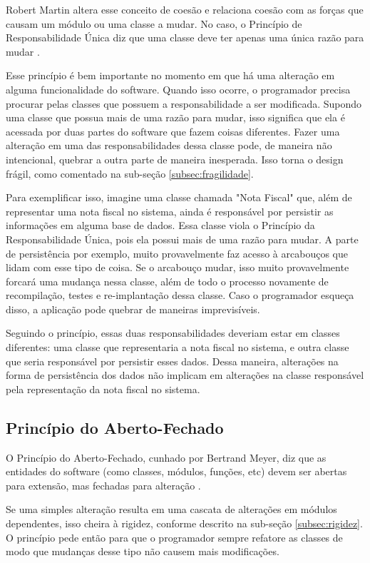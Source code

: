 Robert Martin altera esse conceito de coesão e relaciona coesão com as forças
que  causam um módulo ou uma classe a mudar. No caso, o Princípio de
Responsabilidade Única diz que uma classe deve ter apenas uma única razão para 
mudar \cite{bob-martin}.

Esse princípio é bem importante no momento em que há uma alteração em alguma 
funcionalidade do software. Quando isso ocorre, o programador precisa procurar 
pelas classes que possuem a responsabilidade a ser modificada. Supondo uma
classe  que possua mais de uma razão para mudar, isso significa que ela é
acessada  por duas partes do software que fazem coisas diferentes.  Fazer uma
alteração em uma das responsabilidades dessa classe pode, de maneira não
intencional, quebrar a outra parte de maneira inesperada. Isso torna o design
frágil, como comentado na sub-seção \ref{subsec:fragilidade}.

Para exemplificar isso, imagine uma classe chamada "Nota Fiscal" que, além de
representar uma nota fiscal no sistema, ainda é responsável por persistir as 
informações em alguma base de dados. Essa classe viola o Princípio da
Responsabilidade Única, pois ela possui mais de uma razão para mudar. A parte de
persistência por exemplo, muito provavelmente faz acesso à arcabouços que lidam 
com esse tipo de coisa. Se o arcabouço mudar, isso muito provavelmente forcará
uma  mudança nessa classe, além de todo o processo novamente de recompilação, 
testes e re-implantação dessa classe. Caso o programador esqueça disso, a
aplicação pode quebrar de maneiras imprevisíveis.

Seguindo o princípio, essas duas responsabilidades deveriam estar em classes 
diferentes: uma classe que representaria a nota fiscal no sistema, e outra
classe que seria responsável por persistir esses dados. Dessa maneira,
alterações na forma de persistência dos dados não implicam em alterações na 
classe responsável pela representação da nota fiscal no sistema.

\subsection{Princípio do Aberto-Fechado}
\label{subsec:ocp}

O Princípio do Aberto-Fechado, cunhado por Bertrand Meyer, diz que as entidades
do software (como classes, módulos, funções, etc) devem ser abertas para
extensão, mas fechadas para alteração \cite{meyer-ocp}. 

Se uma simples alteração resulta em uma cascata de alterações em módulos
dependentes, isso cheira à rigidez, conforme descrito na sub-seção 
\ref{subsec:rigidez}. O princípio pede então para que o programador sempre 
refatore as classes de modo que mudanças desse tipo não causem mais modificações.

